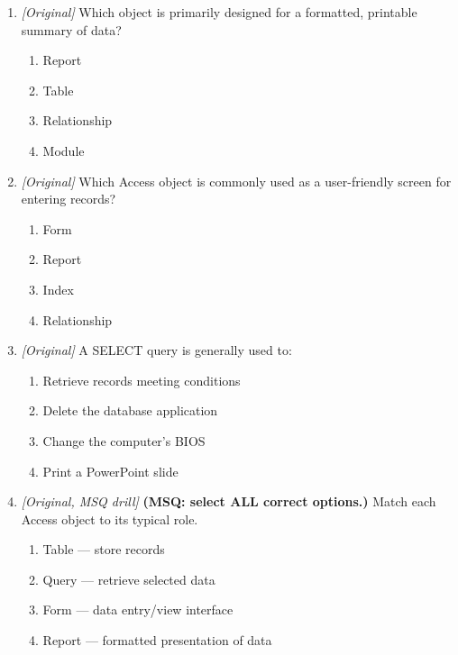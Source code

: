 \begin{enumerate}[label=\textbf{Q\arabic*.}, leftmargin=*]
\item \textit{[Original]} Which object is primarily designed for a formatted, printable summary of data?
  \begin{enumerate}[label=\Alph*.]
\item Report
   \item Table
   \item Relationship
   \item Module
  \end{enumerate}

\item \textit{[Original]} Which Access object is commonly used as a user-friendly screen for entering records?
  \begin{enumerate}[label=\Alph*.]
\item Form
   \item Report
   \item Index
   \item Relationship
  \end{enumerate}

\item \textit{[Original]} A SELECT query is generally used to:
  \begin{enumerate}[label=\Alph*.]
\item Retrieve records meeting conditions
   \item Delete the database application
   \item Change the computer's BIOS
   \item Print a PowerPoint slide
  \end{enumerate}

\item \textit{[Original, MSQ drill]} \textbf{(MSQ: select ALL correct options.)} Match each Access object to its typical role.
  \begin{enumerate}[label=\Alph*.]
\item Table --- store records
   \item Query --- retrieve selected data
   \item Form --- data entry/view interface
   \item Report --- formatted presentation of data
  \end{enumerate}

\end{enumerate}
